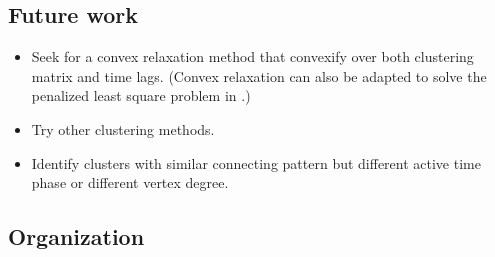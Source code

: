 \subsection*{Future work}
\begin{itemize}
	\item Seek for a convex relaxation method that convexify over both clustering matrix and time lags. 
	(Convex relaxation can also be adapted to solve the penalized least square problem in \citet{Pensky2019a}.)

	\item Try other clustering methods.

	\item Identify clusters with similar connecting pattern but different active time phase or different vertex degree. 

\end{itemize}



\subsection*{Organization}



